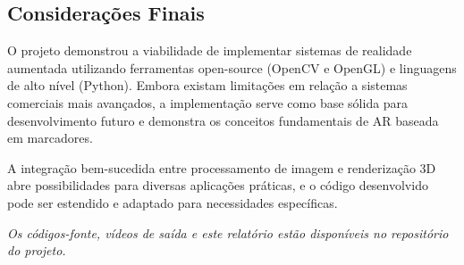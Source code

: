\subsection{Considerações Finais}

O projeto demonstrou a viabilidade de implementar sistemas de realidade aumentada utilizando ferramentas open-source (OpenCV e OpenGL) e linguagens de alto nível (Python). Embora existam limitações em relação a sistemas comerciais mais avançados, a implementação serve como base sólida para desenvolvimento futuro e demonstra os conceitos fundamentais de AR baseada em marcadores.

A integração bem-sucedida entre processamento de imagem e renderização 3D abre possibilidades para diversas aplicações práticas, e o código desenvolvido pode ser estendido e adaptado para necessidades específicas.

\vspace{1cm}

\textit{Os códigos-fonte, vídeos de saída e este relatório estão disponíveis no repositório do projeto.}
